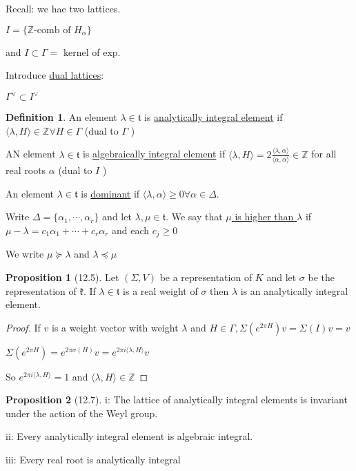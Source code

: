 \documentclass{article}
\theoremstyle{definition}
\newtheorem{definition}{Definition}
\newtheorem{proposition}{Proposition}
\begin{document}
Recall: we hae two lattices.

\(I = \{ \mathbb{Z} \text{-comb of } H_\alpha \} \) 

and \(I \subset \Gamma =\) kernel of exp.

Introduce \underline{dual lattices}:

\(\Gamma ^\vee \subset I ^ \vee\) 

\begin{definition}
    An element \(\lambda \in \mathfrak{t}\) is \underline{analytically integral element} if \(\langle \lambda , H \rangle \in \mathbb{Z} \forall H\in \Gamma \) (dual to \(\Gamma\) )  

    AN element \(\lambda \in \mathfrak{t}\) is \underline{algebraically integral element} if \(\langle \lambda , H \rangle = 2 \frac{\langle \lambda , \alpha \rangle }{\langle \alpha , \alpha \rangle } \in \mathbb{Z} \) for all real roots \(\alpha\) (dual to \(I\) ) 
    
    An element \(\lambda \in \mathfrak{t}\) is \underline{dominant} if \(\langle \lambda , \alpha \rangle \geq 0 \forall \alpha \in \Delta\).
    
    Write \(\Delta = \{ \alpha_1, \cdots, \alpha_r \} \) and let \(\lambda , \mu \in \mathfrak{t}\). We say that \underline{\(\mu\) is higher than \(\lambda\)} if \(\mu - \lambda = c_1 \alpha_1 + \cdots + c_r \alpha_r\) and each \(c_j \geq 0\)
    
    We write \(\mu \succeq \lambda\) and \(\lambda \preceq \mu\) 
\end{definition}

\begin{proposition}
    [12.5] Let \((\Sigma , V)\) be a representation of \(K\) and let \(\sigma\) be the representation of \(\mathfrak{k}\). If \(\lambda \in \mathfrak{t}\) is a real weight of \(\sigma\) then \(\lambda\) is an analytically integral element.      
\end{proposition}

\begin{proof}
    If \(v\) is a weight vector with weight \(\lambda\) and \(H \in \Gamma, \Sigma(e^{2\pi H})v = \Sigma (I)v = v\)
    
    \(\Sigma (e^{2\pi H})=e^{2\pi \sigma(H)}v = e^{2\pi i \langle \lambda , H \rangle }v\) 

    So \(e^{2 \pi i \langle \lambda , H \rangle } = 1\) and \(\langle \lambda , H \rangle \in \mathbb{Z}\)  
\end{proof}

\begin{proposition}
    [12.7]

    i: The lattice of analytically integral elements is invariant under the action of the Weyl group.

    ii: Every analytically integral element is algebraic integral.

    iii: Every real root is analytically integral
\end{proposition}
\end{document}
